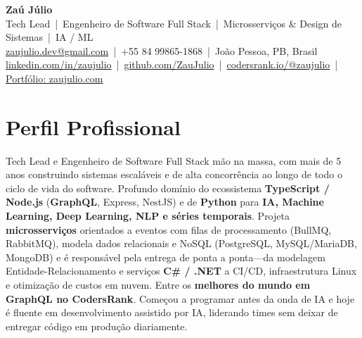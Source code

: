 \documentclass[11pt,a4paper]{article}
\begin{document}
\begin{center}
    {\Huge\bfseries Za\'u J\'ulio} \\[5pt]
    \small Tech Lead \,|\, Engenheiro de Software Full Stack \,|\, Microsservi\c{c}os \& Design de Sistemas \,|\, IA / ML \\[4pt]
    \footnotesize
    \href{mailto:zaujulio.dev@gmail.com}{zaujulio.dev@gmail.com} \,|\, +55 84 99865-1868 \,|\, Jo\~ao Pessoa, PB, Brasil \\[2pt]
    \href{https://linkedin.com/in/zaujulio}{linkedin.com/in/zaujulio} \,|\,
    \href{https://github.com/ZauJulio}{github.com/ZauJulio} \,|\,
    \href{https://profile.codersrank.io/user/zaujulio}{codersrank.io/@zaujulio} \,|\,
    \href{https://zaujulio.com}{Portf\'olio: zaujulio.com}
\end{center}

\section{Perfil Profissional}
Tech Lead e Engenheiro de Software Full Stack m\~ao na massa, com mais de 5 anos construindo sistemas escal\'aveis e de alta concorr\^encia ao longo de todo o ciclo de vida do software. Profundo dom\'inio do ecossistema \textbf{TypeScript / Node.js} (\textbf{GraphQL}, Express, NestJS) e de \textbf{Python} para \textbf{IA, Machine Learning, Deep Learning, NLP e s\'eries temporais}. Projeta \textbf{microsservi\c{c}os} orientados a eventos com filas de processamento (BullMQ, RabbitMQ), modela dados relacionais e NoSQL (PostgreSQL, MySQL/MariaDB, MongoDB) e \'e respons\'avel pela entrega de ponta a ponta---da modelagem Entidade-Relacionamento e servi\c{c}os \textbf{C\# / .NET} a CI/CD, infraestrutura Linux e otimiza\c{c}\~ao de custos em nuvem. Entre os \textbf{melhores do mundo em GraphQL no CodersRank}. Come\c{c}ou a programar antes da onda de IA e hoje \'e fluente em desenvolvimento assistido por IA, liderando times sem deixar de entregar c\'odigo em produ\c{c}\~ao diariamente.

\end{document}
